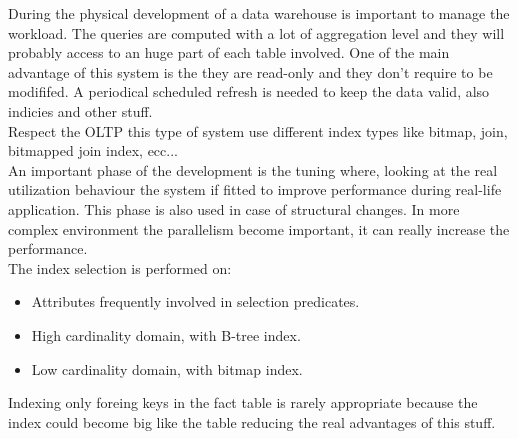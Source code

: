 \documentclass[12pt]{article}
\begin{document}
During the physical development of a data warehouse is important to manage the workload. The queries are computed with a lot of aggregation level and they will probably access to an huge part of each table involved. One of the main advantage of this system is the they are read-only and they don't require to be modififed. A periodical scheduled refresh is needed to keep the data valid, also indicies and other stuff.\\
Respect the OLTP this type of system use different index types like bitmap, join, bitmapped join index, ecc...\\
An important phase of the development is the tuning where, looking at the real utilization behaviour the system if fitted to improve performance during real-life application. This phase is also used in case of structural changes. In more complex environment the parallelism become important, it can really increase the performance.\\
The index selection is performed on:
\begin{itemize}
  \item Attributes frequently involved in selection predicates.
  \item High cardinality domain, with B-tree index.
  \item Low cardinality domain, with bitmap index.
\end{itemize}
Indexing only foreing keys in the fact table is rarely appropriate because the index could become big like the table reducing the real advantages of this stuff.
\end{document}
